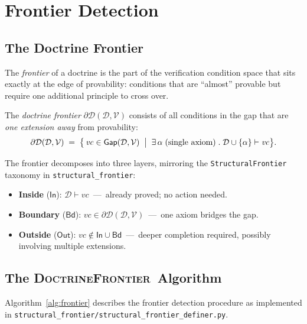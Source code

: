 \documentclass[11pt]{article}
\newcommand{\Doct}{\mathcal{D}}           %
\newcommand{\DoctF}{\partial\Doct}        %
\newcommand{\Gap}{\mathsf{Gap}}           %
\newcommand{\VC}{\mathit{vc}}             %
\newcommand{\VCset}{\mathcal{V}}          %
\newcommand{\SFpkg}{\texttt{structural\_frontier}}
\newcommand{\DoctrineFrontier}{\textsc{DoctrineFrontier}}
\begin{document}
\section{Frontier Detection}\label{sec:frontier}

\subsection{The Doctrine Frontier}

The \emph{frontier} of a doctrine is the part of the verification
condition space that sits exactly at the edge of provability: conditions
that are ``almost'' provable but require one additional principle to
cross over.

\begin{definition}\label{def:frontier}
The \emph{doctrine frontier} $\DoctF(\Doct, \VCset)$ consists of all
conditions in the gap that are \emph{one extension away} from provability:
\[
  \DoctF(\Doct, \VCset)
    \;=\; \bigl\{\,\VC \in \Gap(\Doct,\VCset)
           \;\bigm|\;
           \exists\,\alpha \;\text{(single axiom)}\;.\;
           \Doct \cup \{\alpha\} \vdash \VC
         \bigr\}.
\]
\end{definition}

The frontier decomposes into three layers, mirroring the
\texttt{StructuralFrontier} taxonomy in \SFpkg:

\begin{itemize}[leftmargin=2em]
  \item \textbf{Inside} ($\mathsf{In}$): $\Doct \vdash \VC$~---~already
        proved; no action needed.
  \item \textbf{Boundary} ($\mathsf{Bd}$): $\VC \in \DoctF(\Doct, \VCset)$~---~one
        axiom bridges the gap.
  \item \textbf{Outside} ($\mathsf{Out}$): $\VC \notin \mathsf{In} \cup \mathsf{Bd}$~---~deeper
        completion required, possibly involving multiple extensions.
\end{itemize}

\subsection{The \DoctrineFrontier\ Algorithm}

Algorithm~\ref{alg:frontier} describes the frontier detection procedure
as implemented in \texttt{structural\_frontier/structural\_frontier\_definer.py}.
\end{document}
